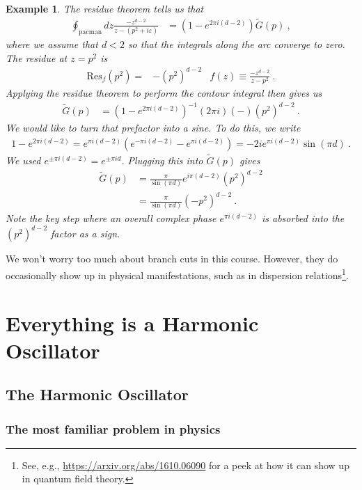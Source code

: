 \documentclass[
  11pt,
	colorful,
	raggedright,
]{tufte-style-thesis-flip}
\newtheorem{example}{Example}[section]
\begin{document}
\begin{example}
The residue theorem tells us that
\begin{align}
  \oint_\text{pacman} {dz} \frac{-z^{d-2}}{z-(p^2+i\varepsilon)}
  &=
  \left(1-e^{2\pi i(d-2)}\right) \tilde G(p) \ ,
\end{align}
where we assume that $d < 2$ so that the integrals along the arc converge to zero. The residue at $z=p^2$ is 
\begin{align}
  \text{Res}_f(p^2) =& -(p^2)^{d-2} 
  &
  f(z)\equiv 
  \frac{-z^{d-2}}{z-p^2} \ .
\end{align}
Applying the residue theorem to perform the contour integral then gives us
\begin{align}
  \tilde G(p) &= \left(1-e^{2\pi i(d-2)}\right)^{-1} (2\pi i) (-) (p^2)^{d-2}  \ .
\end{align}
We would like to turn that prefactor into a sine. To do this, we write
\begin{align}
  1-e^{2\pi i(d-2)}
  =
  e^{\pi i(d-2)}\left(e^{-\pi i(d-2)}-e^{\pi i(d-2)}\right)
  = -2i e^{\pi i(d-2)} \sin(\pi d) \ .
\end{align}
We used $e^{\pm\pi i(d-2)} = e^{\pm\pi id}$. Plugging this into $\tilde G(p)$ gives
\begin{align}
  \tilde G(p) &= 
  \frac{\pi}{\sin(\pi d)}
  e^{i\pi (d-2)}
  (p^2)^{d-2}
  \\
  & =
  \frac{\pi}{\sin(\pi d)} (-p^2)^{d-2} \ .
\end{align}
Note the key step where an overall complex phase $e^{\pi i(d-2)}$ is absorbed into the $(p^2)^{d-2}$ factor as a sign.
\end{example}

We won't worry too much about branch cuts in this course. However, they do occasionally show up in physical manifestations, such as in dispersion relations\footnote{See, e.g., \url{https://arxiv.org/abs/1610.06090} for a peek at how it can show up in quantum field theory.}.

\part{Everything is a Harmonic Oscillator}

\chapter{The Harmonic Oscillator}

\section{The most familiar problem in physics}
\end{document}
